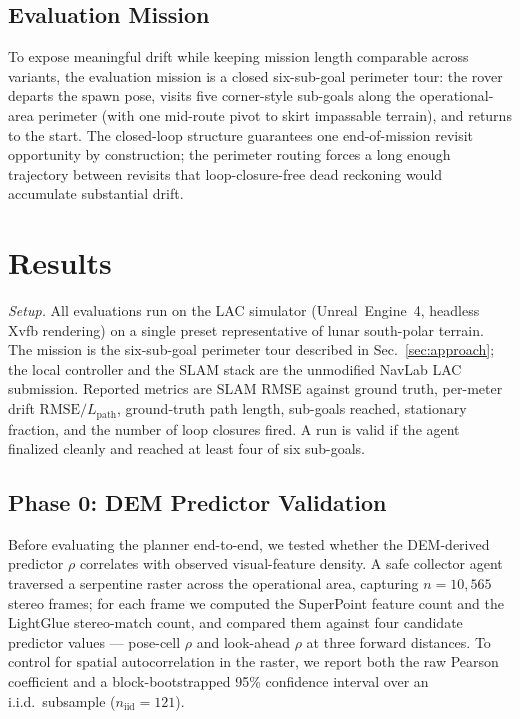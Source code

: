 \documentclass[letterpaper,times]{IONconf}
\begin{document}
\subsection{Evaluation Mission}
To expose meaningful drift while keeping mission length comparable across variants, the evaluation mission is a closed six-sub-goal perimeter tour: the rover departs the spawn pose, visits five corner-style sub-goals along the operational-area perimeter (with one mid-route pivot to skirt impassable terrain), and returns to the start. The closed-loop structure guarantees one end-of-mission revisit opportunity by construction; the perimeter routing forces a long enough trajectory between revisits that loop-closure-free dead reckoning would accumulate substantial drift.


\section{Results}
\label{sec:results}

\emph{Setup.} All evaluations run on the LAC simulator (Unreal~Engine~4, headless Xvfb rendering) on a single preset representative of lunar south-polar terrain. The mission is the six-sub-goal perimeter tour described in Sec.~\ref{sec:approach}; the local controller and the SLAM stack are the unmodified NavLab LAC submission. Reported metrics are SLAM RMSE against ground truth, per-meter drift $\mathrm{RMSE}/L_{\text{path}}$, ground-truth path length, sub-goals reached, stationary fraction, and the number of loop closures fired. A run is valid if the agent finalized cleanly and reached at least four of six sub-goals.

\subsection{Phase 0: DEM Predictor Validation}
\label{sec:phase0}

Before evaluating the planner end-to-end, we tested whether the DEM-derived predictor $\rho$ correlates with observed visual-feature density. A safe collector agent traversed a serpentine raster across the operational area, capturing $n = 10{,}565$ stereo frames; for each frame we computed the SuperPoint feature count and the LightGlue stereo-match count, and compared them against four candidate predictor values --- pose-cell $\rho$ and look-ahead $\rho$ at three forward distances. To control for spatial autocorrelation in the raster, we report both the raw Pearson coefficient and a block-bootstrapped 95\% confidence interval over an i.i.d.\ subsample ($n_{\text{iid}} = 121$).
\end{document}
